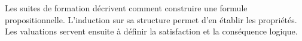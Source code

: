 \documentclass[../../../include/open-logic-chapter]{subfiles}
\begin{document}

Les suites de formation décrivent comment
construire une formule propositionnelle.
L'induction sur sa structure permet d'en
établir les propriétés. Les valuations
servent ensuite à définir la satisfaction
et la conséquence logique.







\OLEndChapterHook
\end{document}
